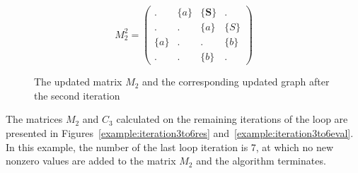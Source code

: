 \begin{figure}
    \begin{subfigure}[]{0.5\textwidth}
    \centering
    $$
    M_2^2 =
    \begin{pmatrix}
    .     & \{a\} & \{\textbf{S}\} & .     \\
    .     & .     & \{a\} & \{S\} \\
    \{a\} & .     & .     & \{b\} \\
    .     & .     & \{b\} & .
    \end{pmatrix}
    $$
    \end{subfigure}
    \begin{subfigure}[]{0.4\textwidth}
    \centering
    \end{subfigure}
    \caption{The updated matrix $M_2$ and the corresponding updated graph after the second iteration}
    \label{example:iteration2res}
\end{figure}

The matrices $M_2$ and $C_3$ calculated on the remaining iterations of the loop are presented in Figures~\ref{example:iteration3to6res} and~\ref{example:iteration3to6eval}. In this example, the number of the last loop iteration is 7, at which no new nonzero values are added to the matrix $M_2$ and the algorithm terminates.


